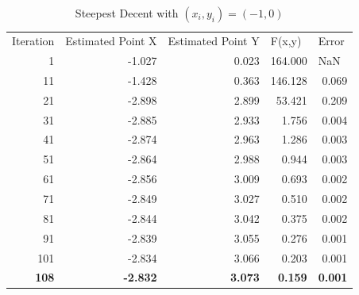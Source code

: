 \documentclass[12pt]{article}
\begin{document}
\begin{table}[h!]
  \centering
  \caption{Steepest Decent with $(x_i,y_i) = (-1,0)$}
    \begin{tabular}{rrrrr}
    \multicolumn{1}{l}{Iteration } & \multicolumn{1}{l}{Estimated Point X} & \multicolumn{1}{l}{Estimated Point Y} & \multicolumn{1}{l}{F(x,y)} & \multicolumn{1}{l}{Error} \\
    1     & -1.027 & 0.023 & 164.000 & \multicolumn{1}{l}{NaN} \\
    11    & -1.428 & 0.363 & 146.128 & 0.069 \\
    21    & -2.898 & 2.899 & 53.421 & 0.209 \\
    31    & -2.885 & 2.933 & 1.756 & 0.004 \\
    41    & -2.874 & 2.963 & 1.286 & 0.003 \\
    51    & -2.864 & 2.988 & 0.944 & 0.003 \\
    61    & -2.856 & 3.009 & 0.693 & 0.002 \\
    71    & -2.849 & 3.027 & 0.510 & 0.002 \\
    81    & -2.844 & 3.042 & 0.375 & 0.002 \\
    91    & -2.839 & 3.055 & 0.276 & 0.001 \\
    101   & -2.834 & 3.066 & 0.203 & 0.001 \\
    \textbf{108} & \textbf{-2.832} & \textbf{3.073} & \textbf{0.159} & \textbf{0.001} \\
    \end{tabular}%
  \label{tab:SDM_gess2}%
\end{table}%
\end{document}
